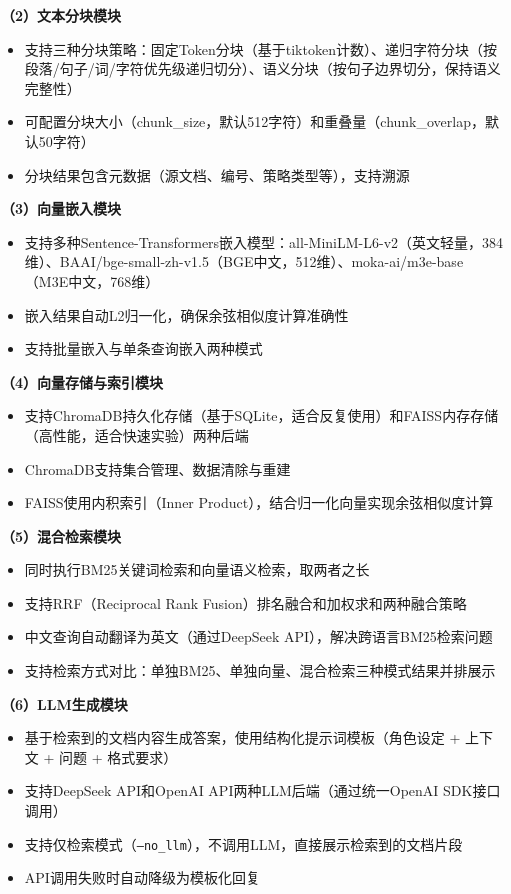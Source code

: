 \documentclass[10pt,a4paper]{article}
\begin{document}
\textbf{（2）文本分块模块}
\begin{itemize}
\item 支持三种分块策略：固定Token分块（基于tiktoken计数）、递归字符分块（按段落/句子/词/字符优先级递归切分）、语义分块（按句子边界切分，保持语义完整性）
\item 可配置分块大小（chunk\_size，默认512字符）和重叠量（chunk\_overlap，默认50字符）
\item 分块结果包含元数据（源文档、编号、策略类型等），支持溯源
\end{itemize}

\textbf{（3）向量嵌入模块}
\begin{itemize}
\item 支持多种Sentence-Transformers嵌入模型：all-MiniLM-L6-v2（英文轻量，384维）、BAAI/bge-small-zh-v1.5（BGE中文，512维）、moka-ai/m3e-base（M3E中文，768维）
\item 嵌入结果自动L2归一化，确保余弦相似度计算准确性
\item 支持批量嵌入与单条查询嵌入两种模式
\end{itemize}

\textbf{（4）向量存储与索引模块}
\begin{itemize}
\item 支持ChromaDB持久化存储（基于SQLite，适合反复使用）和FAISS内存存储（高性能，适合快速实验）两种后端
\item ChromaDB支持集合管理、数据清除与重建
\item FAISS使用内积索引（Inner Product），结合归一化向量实现余弦相似度计算
\end{itemize}

\textbf{（5）混合检索模块}
\begin{itemize}
\item 同时执行BM25关键词检索和向量语义检索，取两者之长
\item 支持RRF（Reciprocal Rank Fusion）排名融合和加权求和两种融合策略
\item 中文查询自动翻译为英文（通过DeepSeek API），解决跨语言BM25检索问题
\item 支持检索方式对比：单独BM25、单独向量、混合检索三种模式结果并排展示
\end{itemize}

\textbf{（6）LLM生成模块}
\begin{itemize}
\item 基于检索到的文档内容生成答案，使用结构化提示词模板（角色设定 + 上下文 + 问题 + 格式要求）
\item 支持DeepSeek API和OpenAI API两种LLM后端（通过统一OpenAI SDK接口调用）
\item 支持仅检索模式（\texttt{--no\_llm}），不调用LLM，直接展示检索到的文档片段
\item API调用失败时自动降级为模板化回复
\end{itemize}
\end{document}
